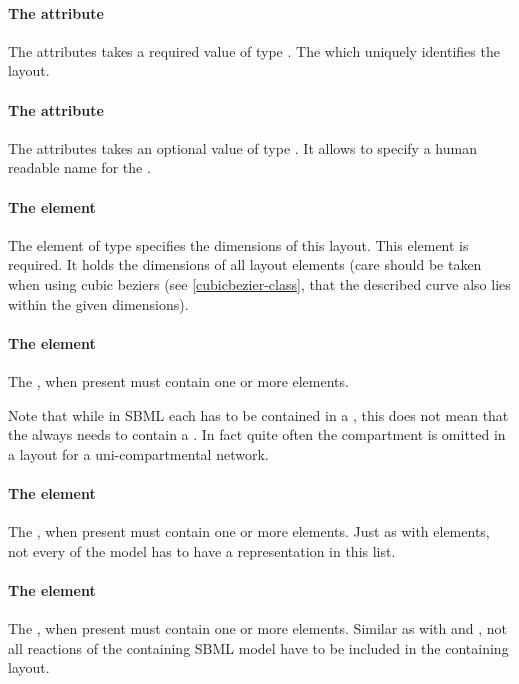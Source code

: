 \paragraph{The  attribute}
The  attributes takes a required value of type . 
The  which uniquely identifies the layout. 


\paragraph{The  attribute}
The  attributes takes an optional value of type 
. It allows to specify a human readable name for the 
\LayoutClass. 


\paragraph{The  element}
The  element of type \Dimensions specifies the 
dimensions of this layout. This element is required. It holds the 
dimensions of all layout elements (care should be taken when using cubic 
beziers (see \ref{cubicbezier-class}, that the described curve also lies 
within the given dimensions). 


\paragraph{The  element}
\label{listofcompartmentglyphs-class}
The , when present must contain one or 
more \CompartmentGlyph elements. 

Note that while in SBML each \Species has to be contained in a 
\Compartment, this does not mean that the \ListOfCompartmentGlyphs 
always needs to contain a \CompartmentGlyph. In fact quite often the 
compartment is omitted in a layout for a uni-compartmental network. 


\paragraph{The  element}
\label{listofspeciesglyphs-class}
The , when present must contain one or more 
\SpeciesGlyph elements. Just as with \CompartmentGlyph elements, not every \Species of the model has to have a representation in this list.


\paragraph{The  element}
\label{listofreactionglyphs-class}
The , when present must contain one or more 
\ReactionGlyph elements. Similar as with \ListOfCompartmentGlyphs and 
\ListOfSpeciesGlyphs, not all reactions of the containing SBML model 
have to be included in the containing layout. 


